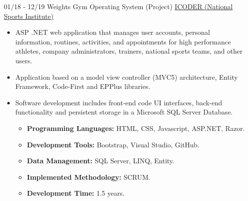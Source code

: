 \documentclass[letterpaper]{twentysecondcv} %
\begin{document}
\begin{twenty}
        \twentyitem
    	{01/18 - 12/19}
        {Weights Gym Operating System (Project)}
        { \href{https://www.icoder.go.cr/}{ICODER (National Sports Institute)} }
        {
            \begin{itemize}
                \item ASP .NET web application that manages user accounts, personal information, routines, activities, and appointments for high performance athletes, company administrators, trainers, national sports teams, and other users.
                \item Application based on a model view controller (MVC5) architecture, Entity Framework, Code-First and EPPlus libraries.
                \item Software development includes front-end code UI interfaces, back-end functionality and persistent storage in a Microsoft SQL Server Database.\\
                    \begin{itemize}
                        \item \textbf{Programming Languages:} HTML, CSS, Javascript, ASP.NET, Razor.
                        \item \textbf{Development Tools:} Bootstrap, Visual Studio, GitHub.
                        \item \textbf{Data Management:} SQL Server, LINQ, Entity.
                        \item \textbf{Implemented Methodology:} SCRUM.
                        \item \textbf{Development Time:} 1.5 years.
                \end{itemize}
            \end{itemize}
        }
        \\
\end{twenty}


\end{document}
